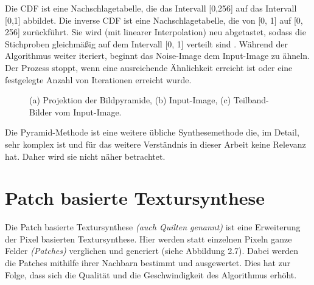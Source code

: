 \documentclass[12pt, a4paper,twoside,openright]{report} %
\begin{document}
Die CDF ist eine Nachschlagetabelle, die das Intervall {[0,256]} auf das Intervall {[0,1]} abbildet.
Die inverse CDF ist eine Nachschlagetabelle, die von {[0, 1]} auf {[0, 256]} zurückführt.
Sie wird {(mit linearer Interpolation)} neu abgetastet,
sodass die Stichproben gleichmäßig auf dem Intervall {[0, 1]} verteilt sind \cite{Heeger}.
\newline
Während der Algorithmus weiter iteriert, beginnt das Noise-Image dem Input-Image zu ähneln.
Der Prozess stoppt, wenn eine ausreichende Ähnlichkeit erreicht ist oder eine festgelegte Anzahl von Iterationen erreicht wurde.

\begin{figure}[H]
    \centering
    \qquad
    \qquad
    \caption{(a) Projektion der Bildpyramide, (b) Input-Image, (c) Teilband-Bilder vom Input-Image.}%
\end{figure}

Die Pyramid-Methode ist eine weitere übliche Synthesemethode die, im Detail, sehr komplex ist und für das weitere Verständnis in dieser Arbeit keine Relevanz hat.
Daher wird sie nicht näher betrachtet.

\section{Patch basierte Textursynthese}

Die Patch basierte Textursynthese \textit{(auch Quilten genannt)} ist eine Erweiterung der Pixel basierten Textursynthese.
Hier werden statt einzelnen Pixeln ganze Felder \textit{(Patches)} verglichen und generiert {(siehe Abbildung 2.7)}.
Dabei werden die Patches mithilfe ihrer Nachbarn bestimmt und ausgewertet.
Dies hat zur Folge, dass sich die Qualität und die Geschwindigkeit des Algorithmus erhöht.
\end{document}
